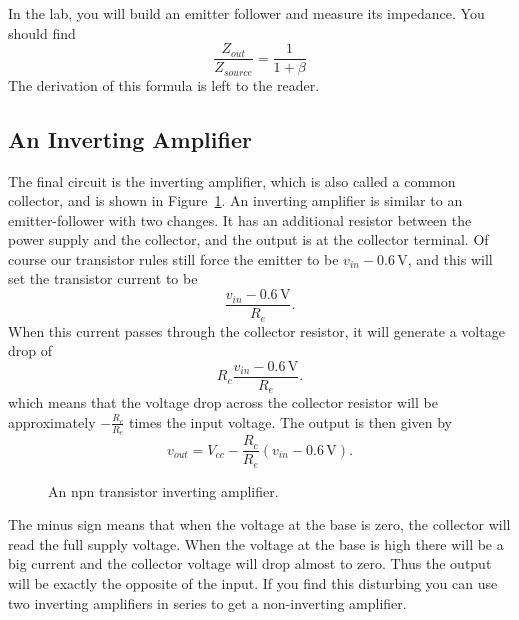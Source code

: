 \documentclass{article}
\begin{document}
In the lab, you will build an emitter follower and measure its impedance. You should find 
\begin{equation}
\frac{Z_{out}}{Z_{source}} = \frac{1}{1 + \beta}
\end{equation}
The derivation of this formula is left to the reader.

\subsection{An Inverting Amplifier}
The final circuit is the inverting amplifier, which is also called a common collector, and is shown in Figure~\ref{fig:inverting_amplifier}. An inverting amplifier is similar to an emitter-follower with two changes. It has an additional resistor between the power supply and the collector, and the output is at the collector terminal. Of course our transistor rules still force the emitter to be $v_{in} - 0.6$\,V, and this will set the transistor current to be 
\begin{equation}
\frac{v_{in} - 0.6\,\mbox{V}}{R_e}.
\end{equation}
When this current passes through the collector resistor, it will generate a voltage drop of 
\begin{equation}
R_c \frac{v_{in} - 0.6\,\mbox{V}}{R_e}.
\end{equation}
which means that the voltage drop across the collector resistor will be approximately $-\frac{R_c}{R_e}$ times the input voltage. The output is then given by
\begin{equation}
v_{out} = V_{cc} - \frac{R_c}{R_e} (v_{in} - 0.6\,\mbox{V}).
\end{equation}

\begin{figure}
\begin{center}
\end{center}
\caption{An npn transistor inverting amplifier.}
\label{fig:inverting_amplifier}
\end{figure}

The minus sign means that when the voltage at the base is zero, the collector will read the full supply voltage. When the voltage at the base is high there will be a big current and the collector voltage will drop almost to zero. Thus the output will be exactly the opposite of the input. If you find this disturbing you can use two inverting amplifiers in series to get a non-inverting amplifier.
\end{document}
